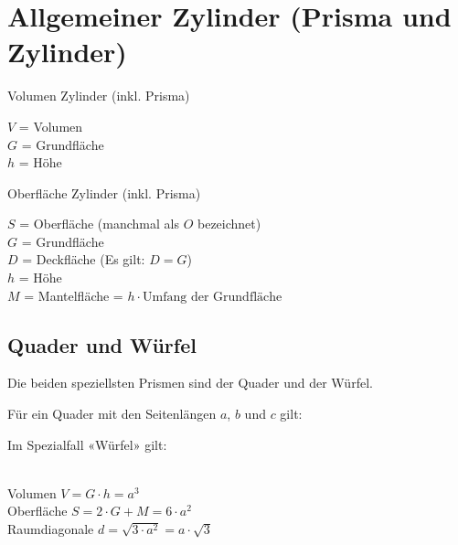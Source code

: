 \section{Allgemeiner Zylinder (Prisma und Zylinder)}


\begin{gesetz}{Volumen Zylinder (inkl. Prisma)}{}

  $V$ = Volumen\\
  $G$ = Grundfläche\\
  $h$ = Höhe\\
  \begin{center}\end{center}
\end{gesetz}

\begin{gesetz}{Oberfläche Zylinder (inkl. Prisma)}{}

  $S$ = Oberfläche (manchmal als $O$ bezeichnet)\\
  $G$ = Grundfläche\\
  $D$ = Deckfläche (Es gilt: $D=G$)\\
  $h$ = Höhe\\
  $M$ = Mantelfläche = $h \cdot{} \textrm{Umfang der Grundfläche}$\\
  \begin{center}\end{center}
\end{gesetz}



\newpage
\subsection{Quader und Würfel}\label{QuaderUndWuerfel}
Die beiden speziellsten Prismen sind der Quader und der Würfel.

Für ein Quader mit den Seitenlängen $a$, $b$ und $c$ gilt:


Im Spezialfall «Würfel» gilt:
\begin{gesetz}{}{}\\
  Volumen $V = G\cdot{} h = a^3$\\
  Oberfläche $S=2\cdot{}G + M = 6\cdot{}a^2$\\
  Raumdiagonale $d = \sqrt{3\cdot{}a^2} = a\cdot{}\sqrt{3}$
\end{gesetz}


